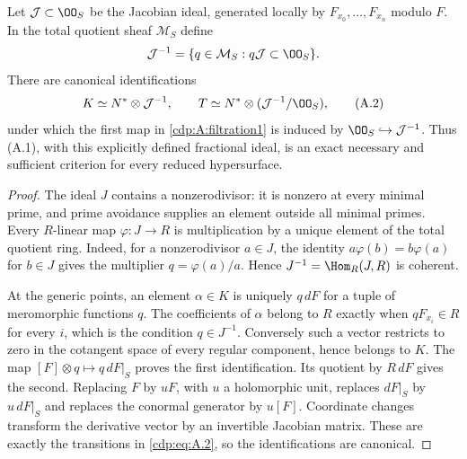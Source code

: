 
\begin{proposition}\label{cdp:st:A.2.1}
Let $\mathcal J\subset\OO_S$ be the Jacobian ideal, generated locally by $F_{x_0},\ldots,F_{x_n}$ modulo $F$. In the total quotient sheaf $\mathcal M_S$ define
\[
 \mathcal J^{-1}=\{q\in\mathcal M_S:q\mathcal J\subset\OO_S\}.
\]
There are canonical identifications
\[
 K\simeq N^*\otimes\mathcal J^{-1},\qquad
 T\simeq N^*\otimes(\mathcal J^{-1}/\OO_S),
\tag{A.2}\label{cdp:eq:A.2}
\]
under which the first map in \eqref{cdp:A:filtration1} is induced by $\OO_S\hookrightarrow\mathcal J^{-1}$. Thus (A.1), with this explicitly defined fractional ideal, is an exact necessary and sufficient criterion for every reduced hypersurface.
\end{proposition}
\begin{proof}
The ideal $J$ contains a nonzerodivisor: it is nonzero at every minimal prime, and prime avoidance supplies an element outside all minimal primes. Every $R$-linear map $\varphi:J\to R$ is multiplication by a unique element of the total quotient ring. Indeed, for a nonzerodivisor $a\in J$, the identity $a\varphi(b)=b\varphi(a)$ for $b\in J$ gives the multiplier $q=\varphi(a)/a$. Hence $J^{-1}=\Hom_R(J,R)$ is coherent.

At the generic points, an element $\alpha\in K$ is uniquely $q\,dF$ for a tuple of meromorphic functions $q$. The coefficients of $\alpha$ belong to $R$ exactly when $qF_{x_i}\in R$ for every $i$, which is the condition $q\in J^{-1}$. Conversely such a vector restricts to zero in the cotangent space of every regular component, hence belongs to $K$. The map $[F]\otimes q\mapsto q\,dF|_S$ proves the first identification. Its quotient by $R\,dF$ gives the second. Replacing $F$ by $uF$, with $u$ a holomorphic unit, replaces $dF|_S$ by $u\,dF|_S$ and replaces the conormal generator by $u[F]$. Coordinate changes transform the derivative vector by an invertible Jacobian matrix. These are exactly the transitions in \eqref{cdp:eq:A.2}, so the identifications are canonical.
\end{proof}


